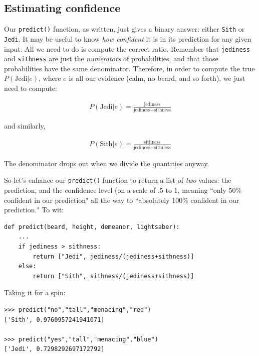 \documentclass[12pt]{article}
\begin{document}
\subsection{Estimating confidence}

Our \texttt{predict()} function, as written, just gives a binary answer:
either \texttt{Sith} or \texttt{Jedi}. It may be useful to know \textit{how
confident} it is in its prediction for any given input. All we need to do is
compute the correct ratio. Remember that \texttt{jediness} and
\texttt{sithness} are just the \textit{numerators} of probabilities, and that
those probabilities have the same denominator. Therefore, in order to compute
the true $P(\textrm{Jedi}|e)$, where $e$ is all our evidence (calm, no beard,
and so forth), we just need to compute:

\begin{align*}
P(\textrm{Jedi}|e) = \frac{\textrm{jediness}}{\textrm{jediness} + \textrm{sithness}}
\end{align*}

and similarly, 

\begin{align*}
P(\textrm{Sith}|e) = \frac{\textrm{sithness}}{\textrm{jediness} + \textrm{sithness}}
\end{align*}

The denominator drops out when we divide the quantities anyway.

So let's enhance our \texttt{predict()} function to return a list of
\textit{two} values: the prediction, and the confidence level (on a scale of
.5 to 1, meaning ``only 50\% confident in our prediction" all the way to
``absolutely 100\% confident in our prediction." To wit:

\begin{Verbatim}[fontsize=\small,samepage=true,frame=none]
def predict(beard, height, demeanor, lightsaber):
    ...
    if jediness > sithness:
        return ["Jedi", jediness/(jediness+sithness)]
    else:
        return ["Sith", sithness/(jediness+sithness)]
\end{Verbatim}

Taking it for a spin:

\begin{Verbatim}[fontsize=\small,samepage=true,frame=none]
>>> predict("no","tall","menacing","red")
['Sith', 0.9760957241941071]

>>> predict("yes","tall","menacing","blue")
['Jedi', 0.7298292697172792]
\end{Verbatim}
\end{document}
